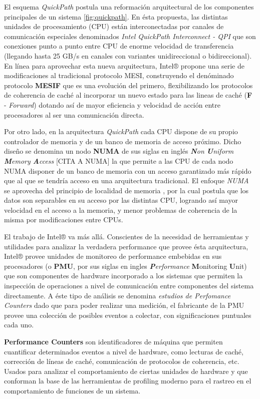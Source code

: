 El esquema \emph{QuickPath} postula una reformación arquitectural de los componentes principales de un sistema \ref{fig:quickpath}. En ésta propuesta, las distintas unidades de procesamiento (CPU) están interconectadas por canales de comunicación especiales denominados \emph{Intel QuickPath Interconnect - QPI} que son conexiones punto a punto entre CPU de enorme velocidad de transferencia (llegando hasta 25 GB/s en canales con variantes unidireccional o bidireccional). En línea para aprovechar esta nueva arquitectura, Intel® propone una serie de modificaciones al tradicional protocolo MESI, construyendo el denóminado protocolo \textbf{MESIF} que es una evolución del primero, flexibilizando los protocolos de coherencia de caché al incorporar un nuevo estado para las lineas de caché (\textbf{F} - \emph{Forward}) dotando así de mayor eficiencia y velocidad de acción entre procesadores al ser una comunicación directa.

Por otro lado, en la arquitectura \emph{QuickPath} cada CPU dispone de su propio controlador de memoria y de un banco de memoria de acceso próximo. Dicho diseño se denomina un nodo \textbf{NUMA} de sus siglas en inglés \emph{\textbf{N}on \textbf{U}niform \textbf{M}emory \textbf{A}ccess} [CITA A NUMA] la que permite a las CPU de cada nodo NUMA disponer de un banco de memoria con un acceso garantizado más rápido que al que se tendría acceso en una arquitectura tradicional. El enfoque \emph{NUMA} se aprovecha del principio de localidad de memoria \cite{paper:memorylocality}, por la cual postula que los datos son separables en su acceso por las distintas CPU, logrando así mayor velocidad en el acceso a la memoria, y menor problemas de coherencia de la misma por modificaciones entre CPUs.

El trabajo de Intel® va más allá. Conscientes de la necesidad de herramientas y utilidades para analizar la verdadera performance que provee ésta arquitectura, Intel® provee unidades de monitoreo de performance embebidas en sus procesadores (o \textbf{PMU}, por sus siglas en ingles \emph{\textbf{P}erformance} \textbf{M}onitoring \textbf{U}nit) que son componentes de hardware incorporado a los sistemas que permiten la inspección de operaciones a nivel de comunicación entre componentes del sistema directamente. A éste tipo de análisis se denomina \emph{estudios de Perfomance Counters} dado que para poder realizar una medición, el fabricante de la PMU provee una colección de posibles eventos a colectar, con significaciones puntuales cada uno.

\begin{defn} \textbf{Performance Counters} son identificadores de máquina que permiten cuantificar determinados eventos a nivel de hardware, como lecturas de caché, corrección de líneas de caché, comunicación de protocolos de coherencia, etc. Usados para analizar el comportamiento de ciertas unidades de hardware y que conforman la base de las herramientas de profiling moderno para el rastreo en el comportamiento de funciones de un sistema.
\end{defn}

